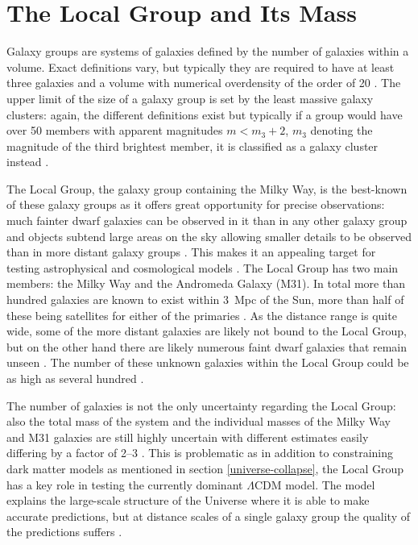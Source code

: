 \documentclass[english, twoside]{HYgradu}
\begin{document}
\section{The Local Group and Its Mass} \label{sect:lg_and_mass}
Galaxy groups are systems of galaxies defined by the number of galaxies within a volume. Exact definitions vary, but typically they are required to have at least three galaxies and a volume with numerical overdensity of the order of 20 \citep{mo2010galaxy}. The upper limit of the size of a galaxy group is set by the least massive galaxy clusters: again, the different definitions exist but typically if a group would have over 50 members with apparent magnitudes $m < m_3 +2$, $m_3$ denoting the magnitude of the third brightest member, it is classified as a galaxy cluster instead \citep{mo2010galaxy}.

The Local Group, the galaxy group containing the Milky Way, is the best-known of these galaxy groups as it offers great opportunity for precise observations: much fainter dwarf galaxies can be observed in it than in any other galaxy group and objects subtend large areas on the sky allowing smaller details to be observed than in more distant galaxy groups \citep{mo2010galaxy, mcconnachie2012observed}. This makes it an appealing target for testing astrophysical and cosmological models \citep{bullock2017small}. The Local Group has two main members: the Milky Way and the Andromeda Galaxy (M31). In total more than hundred galaxies are known to exist within 3~Mpc of the Sun, more than half of these being satellites for either of the primaries \citep{mcconnachie2012observed}. As the distance range is quite wide, some of the more distant galaxies are likely not bound to the Local Group, but on the other hand there are likely numerous faint dwarf galaxies that remain unseen \citep{mcconnachie2012observed}. The number of these unknown galaxies within the Local Group could be as high as several hundred \citep{tollerud2008hundreds}.

The number of galaxies is not the only uncertainty regarding the Local Group: also the total mass of the system and the individual masses of the Milky Way and M31 galaxies are still highly uncertain with different estimates easily differing by a factor of 2--3 \citep{wang2015estimating, carlesi2016constraining}. This is problematic as in addition to constraining dark matter models as mentioned in section \ref{universe-collapse}, the Local Group has a key role in testing the currently dominant $\Lambda$CDM model. The model explains the large-scale structure of the Universe where it is able to make accurate predictions, but at distance scales of a single galaxy group the quality of the predictions suffers \citep{bullock2017small}.
\end{document}
